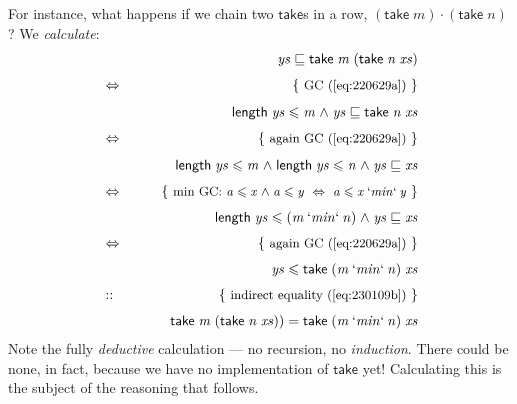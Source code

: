 \documentclass{elsarticle}
\newcommand{\Varid}[1]{\mathit{#1}}
\renewcommand{\leq}{\leqslant}
\def\comp{ \mathbin{\cdot} }
\def\just#1#2{\\ &#1& \rule{2em}{0pt} \{ \mbox{\rule[-.7em]{0pt}{1.8em} \small #2 \/} \} \nonumber\\ && }
\def\start{&&}
\def\equiv{\Leftrightarrow}
\begin{document}
For instance, what happens if we chain two \ensuremath{\mathsf{take}}s in a row, \ensuremath{(\mathsf{take}\;\Varid{m}) \comp (\mathsf{take}\;\Varid{n})}?
We \emph{calculate}:
\begin{eqnarray*}
\start
	\ensuremath{\Varid{ys}\sqsubseteq \mathsf{take}\;\Varid{m}\;(\mathsf{take}\;\Varid{n}\;\Varid{xs})}
%
\just\equiv{GC (\ref{eq:220629a}) }
%
	\ensuremath{\mathsf{length}\;\Varid{ys}\leq \Varid{m}\mathrel{\wedge}\Varid{ys}\sqsubseteq \mathsf{take}\;\Varid{n}\;\Varid{xs}}
%
\just\equiv{again GC (\ref{eq:220629a}) }
%
	\ensuremath{\mathsf{length}\;\Varid{ys}\leq \Varid{m}\mathrel{\wedge}\mathsf{length}\;\Varid{ys}\leq \Varid{n}\mathrel{\wedge}\Varid{ys}\sqsubseteq \Varid{xs}}
%
\just\equiv{min GC: \ensuremath{\Varid{a}\leq \Varid{x}\mathrel{\wedge}\Varid{a}\leq \Varid{y}~\Leftrightarrow~\Varid{a}\leq \Varid{x}\mathbin{`\Varid{min}`}\Varid{y}}}
%
	\ensuremath{\mathsf{length}\;\Varid{ys}\leq (\Varid{m}\mathbin{`\Varid{min}`}\Varid{n})\mathrel{\wedge}\Varid{ys}\sqsubseteq \Varid{xs}}
%
\just\equiv{again GC (\ref{eq:220629a}) }
%
	\ensuremath{\Varid{ys}\leq \mathsf{take}\;(\Varid{m}\mathbin{`\Varid{min}`}\Varid{n})\;\Varid{xs}}
%
\just{::}{ indirect equality (\ref{eq:230109b}) }
%
	\ensuremath{\mathsf{take}\;\Varid{m}\;(\mathsf{take}\;\Varid{n}\;\Varid{xs}))\mathrel{=}\mathsf{take}\;(\Varid{m}\mathbin{`\Varid{min}`}\Varid{n})\;\Varid{xs}}
%
\end{eqnarray*}
Note the fully \emph{deductive} calculation --- no recursion, no \emph{induction}.
There could be none, in fact, because we have no implementation of \ensuremath{\mathsf{take}} yet!
Calculating this is the subject of the reasoning that follows.
\end{document}
